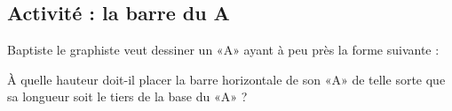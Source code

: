 
\subsection*{Activité : la barre du A}

    Baptiste le graphiste veut dessiner un «A» ayant à peu près la forme suivante :

\begin{center}
   
\end{center}

    À quelle hauteur doit-il placer la barre horizontale de son «A» de telle sorte que sa longueur soit le tiers de la base du «A» ?

